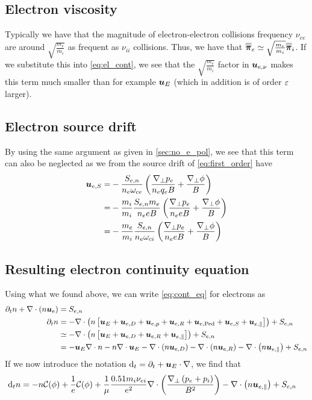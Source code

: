 \subsection{Electron viscosity}
%
Typically we have that the magnitude of electron-electron collisions frequency $\nu_{ee}$ are around $\sqrt{\frac{m_e}{m_i}}$ as frequent as $\nu_{ii}$ collisions.
Thus, we have that $\boldsymbol{\overline{\overline{\pi}}}_e \simeq \sqrt{\frac{m_e}{m_i}}\boldsymbol{\overline{\overline{\pi}}}_i$.
If we substitute this into \cref{eq:el_cont}, we see that the $\sqrt{\frac{m_e}{m_i}}$ factor in $\boldsymbol{u}_{e, \nu}$ makes this term much smaller than for example $\boldsymbol{u}_E$ (which in addition is of order $\varepsilon$ larger).

\subsection{Electron source drift}
\label{sec:no_e_source}
%
By using the same argument as given in \cref{sec:no_e_pol}, we see that this term can also be neglected as we from the source drift of \cref{eq:first_order} have
%
\begin{align*}
    \ve{u}_{e,S}
    =&
  - \frac{ S_{e,n}}{n_e \om_{ce}}
  \L( \frac{\grad_\perp p_e}{n_e q_e B}
  + \frac{\grad_\perp \phi}{B} \R)
  \\
%
  =&
  - \frac{m_i}{m_i}
  \frac{ S_{e,n} m_e}{n_e e B} \L(
   \frac{\grad_\perp p_e}{n_e e B}
  + \frac{\grad_\perp \phi}{B} \R)
  \\
%
  =&
  - \frac{m_e}{m_i} \frac{ S_{e,n}}{n_e \om_{ci}} \L(
  \frac{\grad_\perp p_e}{n_e e B}
  + \frac{\grad_\perp \phi}{B}
  \R)
\end{align*}

\subsection{Resulting electron continuity equation}
%
Using what we found above, we can write \cref{eq:cont_eq} for electrons as
%
\begin{align*}
    \partial_t n + \div\L(n\ve{u}_e\R)
    &= S_{e,n}
    \\
%
    \partial_t n
    &=
    - \div\L(n\L[ \ve{u}_E
    + \ve{u}_{e,D}
    + \ve{u}_{e,p}
    + \ve{u}_{e,R}
    + \ve{u}_{e,\text{Ped}}
    + \ve{u}_{e,S}
    + \ve{u}_{e,\|} \R]\R)
    + S_{e,n}
    \\
%
    &\simeq
    - \div\L(n\L[\ve{u}_E + \ve{u}_{e,D} + \ve{u}_{e,R} + \ve{u}_{e,\|}\R]\R)
    + S_{e,n}
    \\
%
    &=
    - \ve{u}_E\nabla\cdot n
    - n\div\ve{u}_E
    - \div\L(n \ve{u}_{e,D}\R)
    - \div\L(n \ve{u}_{e,R}\R)
    - \div\L(n \ve{u}_{e,\|}\R)
    + S_{e,n}
\end{align*}
%
If we now introduce the notation $\text{d}_t = \partial_t + \boldsymbol{u}_E\cdot\nabla$, we find that
%
\begin{align}
    \text{d}_t n
    &=
    - n\mathcal{C}(\phi)
    + \frac{1}{e}\mathcal{C}(\phi)
    +\frac{1}{\mu}\frac{0.51m_i\nu_{ei}}{e^2}
    \nabla\cdot\left( \frac{\nabla_\perp \left(p_e + p_i\right)}{B^2} \right)
    - \nabla\cdot\left(n \boldsymbol{u}_{e,\|}\right)
    + S_{e,n}
    \label{eq:dens_evol_gen}
\end{align}

